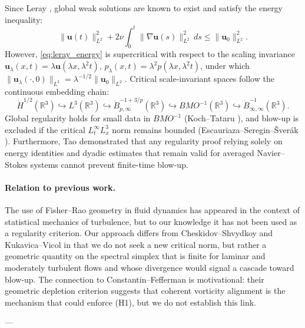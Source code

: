 \documentclass[11pt,a4paper]{article}
\theoremstyle{definition}
\theoremstyle{remark}
\begin{document}
Since Leray \cite{Leray1934}, global weak solutions are known to exist and satisfy the energy inequality:
\begin{equation}
\label{eq:leray_energy}
\|\mathbf{u}(t)\|_{L^2}^2 + 2\nu \int_0^t \|\nabla \mathbf{u}(s)\|_{L^2}^2 \, ds \le \|\mathbf{u}_0\|_{L^2}^2.
\end{equation}
However, \eqref{eq:leray_energy} is supercritical with respect to the scaling invariance $\mathbf{u}_\lambda(x, t) = \lambda \mathbf{u}(\lambda x, \lambda^2 t)$, $p_\lambda(x, t) = \lambda^2 p(\lambda x, \lambda^2 t)$, under which $\|\mathbf{u}_\lambda(\cdot, 0)\|_{L^2} = \lambda^{-1/2} \|\mathbf{u}_0\|_{L^2}$. Critical scale-invariant spaces follow the continuous embedding chain:
\begin{equation}
\dot{H}^{1/2}(\mathbb{R}^3) \hookrightarrow L^3(\mathbb{R}^3) \hookrightarrow \dot{B}^{-1 + 3/p}_{p, \infty}(\mathbb{R}^3) \hookrightarrow BMO^{-1}(\mathbb{R}^3) \hookrightarrow \dot{B}^{-1}_{\infty, \infty}(\mathbb{R}^3).
\end{equation}
Global regularity holds for small data in $BMO^{-1}$ (Koch--Tataru \cite{KochTataru2001}), and blow-up is excluded if the critical $L^\infty_t L^3_x$ norm remains bounded (Escauriaza--Seregin--\v{S}ver\'ak \cite{ESS2003}). Furthermore, Tao \cite{Tao2016} demonstrated that any regularity proof relying solely on energy identities and dyadic estimates that remain valid for averaged Navier--Stokes systems cannot prevent finite-time blow-up.

\paragraph{Relation to previous work.}
The use of Fisher--Rao geometry in fluid dynamics has appeared in the context of statistical mechanics of turbulence, but to our knowledge it has not been used as a regularity criterion. Our approach differs from Cheskidov--Shvydkoy \cite{CheskidovShvydkoy2010} and Kukavica--Vicol \cite{KukavicaVicol2009} in that we do not seek a new critical norm, but rather a geometric quantity on the spectral simplex that is finite for laminar and moderately turbulent flows and whose divergence would signal a cascade toward blow-up. The connection to Constantin--Fefferman \cite{ConstantinFefferman1993} is motivational: their geometric depletion criterion suggests that coherent vorticity alignment is the mechanism that could enforce (H1), but we do not establish this link.

---
\end{document}
